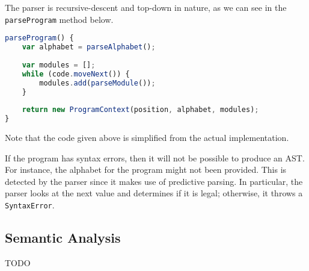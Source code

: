 The parser is recursive-descent and top-down in nature, as we can see in the \texttt{parseProgram} method below.
\begin{lstlisting}[language=TypeScript]
parseProgram() {
    var alphabet = parseAlphabet();
    
    var modules = [];
    while (code.moveNext()) {
        modules.add(parseModule());
    }
    
    return new ProgramContext(position, alphabet, modules);
}
\end{lstlisting}
Note that the code given above is simplified from the actual implementation.

If the program has syntax errors, then it will not be possible to produce an AST. For instance, the alphabet for the program might not been provided. This is detected by the parser since it makes use of predictive parsing. In particular, the parser looks at the next value and determines if it is legal; otherwise, it throws a \texttt{SyntaxError}.

\subsection{Semantic Analysis}
TODO



    
        

